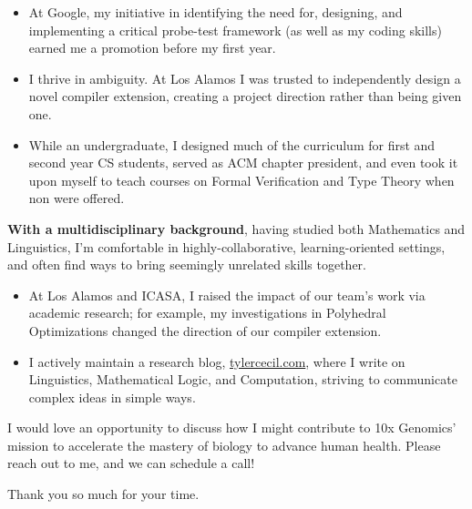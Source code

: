 \documentclass[sans, a4paper, 11pt]{article}
\newcommand{\cvcolor}[1]{{\color{MidnightBlue}#1}}
\renewcommand{\hl}[1]{\cvcolor{\textbf{#1}}}
\begin{document}
\begin{adjustwidth}{40pt}{40pt}
\begin{itemize}
  \begin{itemize}

    \item At Google, my initiative in identifying the need for, designing, and
      implementing a critical probe-test framework (as well as my coding
      skills) earned me a promotion before my first year.

    \item I thrive in ambiguity. At Los Alamos I was trusted to independently
      design a novel compiler extension, creating a project direction rather
      than being given one.

    \item While an undergraduate, I designed much of the curriculum for first
      and second year CS students, served as ACM chapter president, and even
      took it upon myself to teach courses on Formal Verification and Type
      Theory when non were offered.

  \end{itemize}\smallskip


  \hl{With a multidisciplinary background}, having studied both Mathematics and
  Linguistics, I'm comfortable in highly-collaborative, learning-oriented
  settings, and often find ways to bring seemingly unrelated skills together.

  \begin{itemize}

    \item At Los Alamos and ICASA, I raised the impact of our team's work via
      academic research; for example, my investigations in Polyhedral
      Optimizations changed the direction of our compiler extension.

    \item I actively maintain a research blog, \url{tylercecil.com}, where I
      write on Linguistics, Mathematical Logic, and Computation, striving to
      communicate complex ideas in simple ways.

  \end{itemize} \medskip

  I would love an opportunity to discuss how I might contribute to 10x
  Genomics' mission to accelerate the mastery of biology to advance human
  health. Please reach out to me, and we can schedule a call!  \bigskip

  Thank you so much for your time.


\end{itemize}
\end{adjustwidth}
\end{document}
